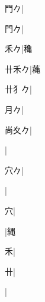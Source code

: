 \begin{multicols}{2}
{{\cjk{}{\cnsym{}　}門{\cnxb{}𠂊}}|{}\par
{門{\cnxb{}𠂊}}|{}\par
{\cjk{}{\cnsym{}　}禾{\cnxb{}𠂊}}|{\cjk{}穐}\par
{\cjk{}卄禾{\cnxb{}𠂊}}|{\cjk{}蘒}\par
{\cjk{}卄{犭}{\cnxb{}𠂊}}|{}\par
{\cjk{}{\cnsym{}　}月{\cnxb{}𠂊}}|{}\par
{\cjk{}尚夊{\cnxb{}𠂊}}|{}\par
{}|{}\par
{\cjk{}{\cnsym{}　}穴{\cnxb{}𠂊}}|{}\par
{}|{}\par
{\cjk{}{\cnsym{}　}{\cnsym{}　}穴}|{}\par
{}|{\cjk{}縄}\par
{\cjk{}{\cnsym{}　}{\cnsym{}　}禾}|{}\par
{\cjk{}{\cnsym{}　}{\cnsym{}　}卄}|{}\par
{\cjk{}{\cnsym{}　}{\cnsym{}　}{\cnsym{}　}}|{}\par
}
\end{multicols}
